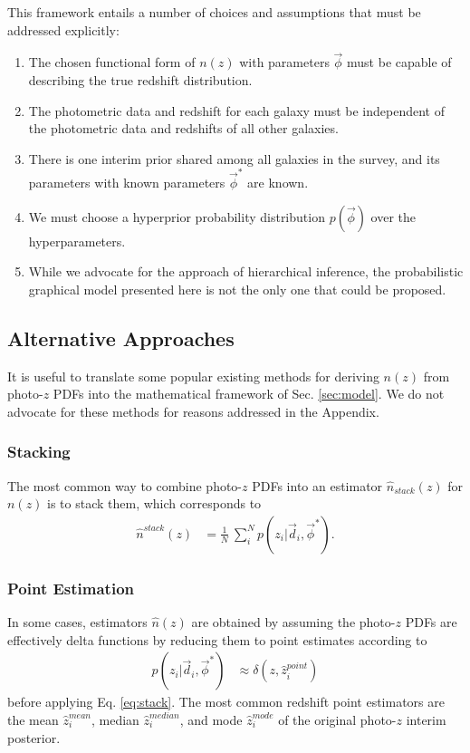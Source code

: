 \documentclass[iop]{emulateapj}
\begin{document}
This framework entails a number of choices and assumptions that must be 
addressed explicitly:
\begin{enumerate}
	\item The chosen functional form of $n(z)$ with parameters $\vec{\phi}$ 
must be capable of describing the true redshift distribution.
	\item The photometric data and redshift for each galaxy must be 
independent of the photometric data and redshifts of all other galaxies.
	\item There is one interim prior shared among all galaxies in the 
survey, and its parameters with known parameters $\vec{\phi}^{*}$ are known.
	\item We must choose a hyperprior probability distribution 
$p(\vec{\phi})$ over the hyperparameters.
	\item While we advocate for the approach of hierarchical inference, the 
probabilistic graphical model presented here is not the only one that could be 
proposed.
\end{enumerate}

\subsection{Alternative Approaches}
\label{sec:others}

It is useful to translate some popular existing methods for deriving $n(z)$ 
from photo-$z$ PDFs into the mathematical framework of Sec. \ref{sec:model}.  
We do not advocate for these methods for reasons addressed in the Appendix.

\subsubsection{Stacking}
\label{sec:stacking}

The most common way to combine photo-$z$ PDFs into an estimator 
$\hat{n}_{stack}(z)$ for $n(z)$ is to stack them, which corresponds to
\begin{align}
\label{eq:stack}
\hat{n}^{stack}(z) &= \frac{1}{N}\ \sum_{i}^{N} p(z_{i} | \vec{d}_{i}, 
\vec{\phi}^{*}).
\end{align}

\subsubsection{Point Estimation}
\label{sec:point_estimation}

In some cases, estimators $\hat{n}(z)$ are obtained by assuming the photo-$z$ 
PDFs are effectively delta functions by reducing them to point estimates 
according to
\begin{align}
\label{eq:delta}
p(z_{i} | \vec{d}_{i}, \vec{\phi}^{*}) &\approx \delta(z, \hat{z}_{i}^{point})
\end{align}
before applying Eq. \ref{eq:stack}.  The most common redshift point estimators 
are the mean $\hat{z}^{mean}_{i}$, median $\hat{z}^{median}_{i}$, and mode 
$\hat{z}^{mode}_{i}$ of the original photo-$z$ interim posterior.  
\end{document}
